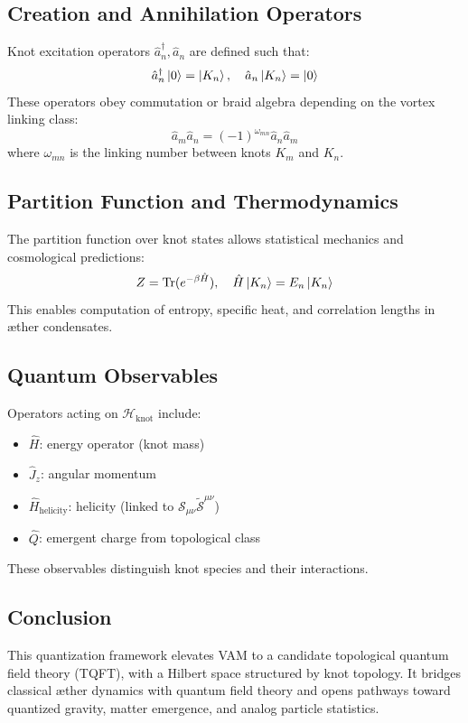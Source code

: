     \subsection{Creation and Annihilation Operators}
    Knot excitation operators $\hat{a}_n^\dagger, \hat{a}_n$ are defined such that:
    \begin{equation}
        \hat{a}_n^\dagger \ket{0} = \ket{K_n}, \quad \hat{a}_n \ket{K_n} = \ket{0}
    \end{equation}
    These operators obey commutation or braid algebra depending on the vortex linking class:
    \begin{equation}
        \hat{a}_m \hat{a}_n = (-1)^{\omega_{mn}} \hat{a}_n \hat{a}_m
    \end{equation}
    where $\omega_{mn}$ is the linking number between knots $K_m$ and $K_n$.

    \subsection{Partition Function and Thermodynamics}
    The partition function over knot states allows statistical mechanics and cosmological predictions:
    \begin{equation}
        Z = \text{Tr}(e^{-\beta \hat{H}}), \quad \hat{H} \ket{K_n} = E_n \ket{K_n}
    \end{equation}
    This enables computation of entropy, specific heat, and correlation lengths in æther condensates.

    \subsection{Quantum Observables}
    Operators acting on $\mathcal{H}_{\text{knot}}$ include:
    \begin{itemize}
        \item $\hat{H}$: energy operator (knot mass)
        \item $\hat{J}_z$: angular momentum
        \item $\hat{H}_\text{helicity}$: helicity (linked to $\mathcal{S}_{\mu\nu} \tilde{\mathcal{S}}^{\mu\nu}$)
        \item $\hat{Q}$: emergent charge from topological class
    \end{itemize}
    These observables distinguish knot species and their interactions.

    \subsection{Conclusion}
    This quantization framework elevates VAM to a candidate topological quantum field theory (TQFT), with a Hilbert space structured by knot topology. It bridges classical æther dynamics with quantum field theory and opens pathways toward quantized gravity, matter emergence, and analog particle statistics.


